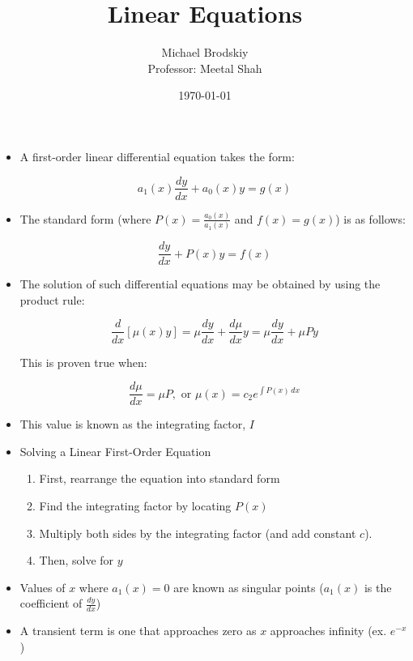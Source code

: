 \documentclass[12pt]{article}
\title{Linear Equations}
\date{\today}
\author{Michael Brodskiy\\ \small Professor: Meetal Shah}
\begin{document}
\maketitle

\begin{itemize}

  \item A first-order linear differential equation takes the form:

    $$a_1(x)\frac{dy}{dx}+a_0(x)y=g(x)$$

  \item The standard form (where $P(x)=\frac{a_0(x)}{a_1(x)}$ and $f(x)=g(x)$) is as follows:

      $$\frac{dy}{dx}+P(x)y=f(x)$$

    \item The solution of such differential equations may be obtained by using the product rule:

      $$\frac{d}{dx}[\mu(x)y]=\mu\frac{dy}{dx}+\frac{d\mu}{dx}y=\mu\frac{dy}{dx}+\mu Py$$
      \begin{center} This is proven true when: \end{center}

    $$\frac{d\mu}{dx}=\mu P,\text{ or } \mu(x)=c_2e^{\int P(x)\,dx}$$

    \item This value is known as the integrating factor, $I$

    \item Solving a Linear First-Order Equation

      \begin{enumerate}

        \item First, rearrange the equation into standard form

        \item Find the integrating factor by locating $P(x)$

        \item Multiply both sides by the integrating factor (and add constant $c$).

        \item Then, solve for $y$

      \end{enumerate}

    \item Values of $x$ where $a_1(x)=0$ are known as singular points ($a_1(x)$ is the coefficient of $\frac{dy}{dx}$)

    \item A transient term is one that approaches zero as $x$ approaches infinity (ex. $e^{-x}$)


\end{itemize}
\end{document}
